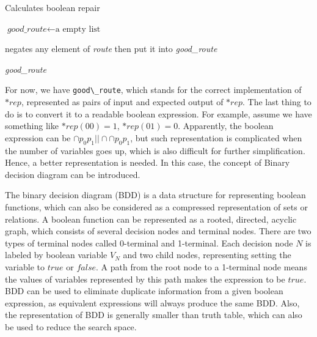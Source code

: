 \begin{algorithm}
\caption{Calculates boolean repair}
\begin{algorithmic}[1]
\STATE $\textit{good\_route} \gets \text{a empty list}$
\STATE

  \STATE negates any element of \textit{route} then put it into \textit{good\_route}
\ENDFOR

\STATE
\RETURN \textit{good\_route}

\end{algorithmic}
\end{algorithm}

For now, we have \lstinline|good\_route|, which stands for the correct implementation of $*rep$, represented as pairs of input and expected output of $*rep$. The last thing to do is to convert it to a readable boolean expression.
For example, assume we have something like $*rep(00) = 1$, $*rep(01) = 0$. Apparently, the boolean expression can be $\cap{p_{0}p_{1}} || \cap{\cap{p_{0}}p_{1}}$,
but such representation is complicated when the number of variables goes up, which is also difficult for further simplification. Hence, a better representation is needed.
In this case, the concept of Binary decision diagram\cite{BDD} can be introduced.

The binary decision diagram (BDD) is a data structure for representing boolean functions, which can also be considered as a compressed representation of sets or relations\cite{TfEFVUBDD,FtOVOfBDD}.
A boolean function can be represented as a rooted, directed, acyclic graph, which consists of several decision nodes and terminal nodes. There are two types of terminal nodes called 0-terminal and 1-terminal.
Each decision node $N$ is labeled by boolean variable $V_{N}$ and two child nodes, representing setting the variable to $true$ or $false$.
A path from the root node to a 1-terminal node means the values of variables represented by this path makes the expression to be $true$.
BDD can be used to eliminate duplicate information from a given boolean expression, as equivalent expressions will always produce the same BDD. Also, the representation of BDD is generally smaller than truth table, which can also be used to reduce the search space.

